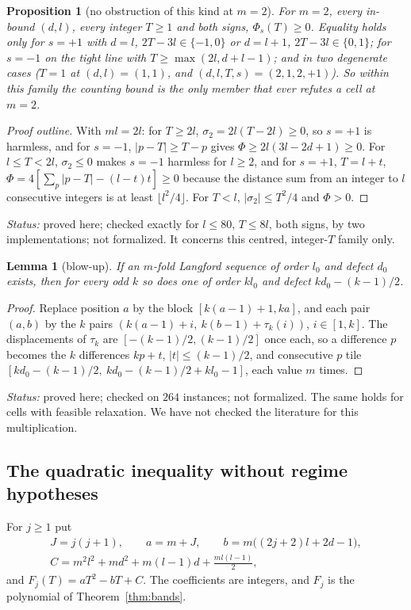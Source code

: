 \documentclass[11pt]{amsart}
\theoremstyle{plain}
\newtheorem{lemma}[theorem]{Lemma}
\newtheorem{proposition}[theorem]{Proposition}
\theoremstyle{definition}
\theoremstyle{remark}
\newcommand{\status}[1]{\par\smallskip
  {\small\raggedright\noindent\textit{Status:} #1\par}\smallskip}
\begin{document}
\begin{proposition}[no obstruction of this kind at $m = 2$]\label{prop:m2}
For $m = 2$, every in-bound $(d,l)$, every integer $T \ge 1$ and both signs,
$\Phi_s(T) \ge 0$. Equality holds only for $s = +1$ with $d = l$, $2T - 3l \in \{-1,0\}$
or $d = l+1$, $2T - 3l \in \{0,1\}$; for $s = -1$ on the tight line with
$T \ge \max(2l, d+l-1)$; and in two degenerate cases ($T = 1$ at $(d,l) = (1,1)$, and
$(d,l,T,s) = (2,1,2,+1)$). So within this family the counting bound is the only member
that ever refutes a cell at $m = 2$.
\end{proposition}

\begin{proof}[Proof outline]
With $ml = 2l$: for $T \ge 2l$, $\sigma_2 = 2l(T-2l) \ge 0$, so $s = +1$ is harmless, and
for $s = -1$, $|p-T| \ge T-p$ gives $\Phi \ge 2l(3l-2d+1) \ge 0$. For $l \le T < 2l$,
$\sigma_2 \le 0$ makes $s = -1$ harmless for $l \ge 2$, and for $s = +1$, $T = l+t$,
$\Phi = 4[\sum_p|p-T| - (l-t)t] \ge 0$ because the distance sum from an integer to $l$
consecutive integers is at least $\lfloor l^2/4 \rfloor$. For $T < l$,
$|\sigma_2| \le T^2/4$ and $\Phi > 0$.
\end{proof}
\status{proved here; checked exactly for $l \le 80$, $T \le 8l$, both signs, by two
implementations; not formalized. It concerns this centred, integer-$T$ family only.}

\begin{lemma}[blow-up]\label{lem:blowup}
If an $m$-fold Langford sequence of order $l_0$ and defect $d_0$ exists, then for every
odd $k$ so does one of order $kl_0$ and defect $kd_0 - (k-1)/2$.
\end{lemma}

\begin{proof}
Replace position $a$ by the block $[k(a-1)+1,ka]$, and each pair $(a,b)$ by the $k$ pairs
$(k(a-1)+i,\ k(b-1)+\tau_k(i))$, $i \in [1,k]$. The displacements of $\tau_k$ are
$[-(k-1)/2,(k-1)/2]$ once each, so a difference $p$ becomes the $k$ differences
$kp + t$, $|t| \le (k-1)/2$, and consecutive $p$ tile
$[kd_0 - (k-1)/2,\ kd_0 - (k-1)/2 + kl_0 - 1]$, each value $m$ times.
\end{proof}
\status{proved here; checked on $264$ instances; not formalized. The same holds for
cells with feasible relaxation. We have not checked the literature for this
multiplication.}

\subsection*{The quadratic inequality without regime hypotheses}
For $j \ge 1$ put
\begin{gather*}
  J = j(j+1), \qquad a = m + J, \qquad b = m\bigl((2j+2)l + 2d - 1\bigr),\\
  C = m^2l^2 + md^2 + m(l-1)d + \frac{ml(l-1)}{2},
\end{gather*}
and $F_j(T) = aT^2 - bT + C$. The coefficients are integers, and $F_j$ is the polynomial
of Theorem~\ref{thm:bands}.
\end{document}
